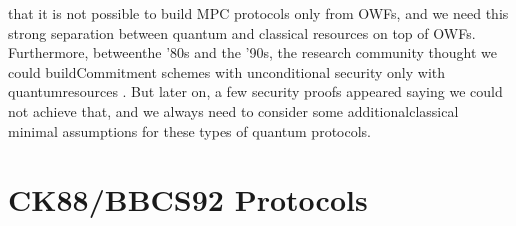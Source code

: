 \documentclass[12pt]{article}
\begin{document}
that it is not possible to build MPC protocols only from OWFs, and we need this strong separation between quantum and classical resources on top of OWFs. Furthermore, between\break the '80s and the '90s, the research community thought we could build\break Commitment schemes with unconditional security only with quantum\break resources \cite{brassard-crepeau-jozsa-langlois:quantum-bit-commitment-scheme-provably-unbreakable-both-parties:1993:03-2024,brassard-crepeau:25-years-quantum-cryptography:1996:03-2024,crepeau:what-going-wrong-quantum-bit-commitment:1996:03-2024,mayers:unconditional-secure-quantum-bit-commitment-impossible:1997:03-2024,brassard-crepeau-mayers-salvail:brief-review-impossibility-quantum-bit-commitment:1997:03-2024,lo-chau:why-quantum-bit-commitment-ideal-quantum-coin-tossing-impossible:1998:03-2024,brassard-crepeau-mayers-salvail:defeating-classical-bit-commitments-quantum-computer:1998:03-2024,kent:quantum-bit-commitment-from-computation-bound:1999:03-2024,kent:permanently-secure-quantum-bit-commitment-temporary-computation-boud:1999:03-2024}. But later on, a few security proofs appeared saying we could not achieve that, and we always need to consider some additional\break classical minimal assumptions for these types of quantum protocols.
    
    \section{CK88/BBCS92 Protocols}
    \label{sec:ck88-bbcs92-protocols}
    
\end{document}
